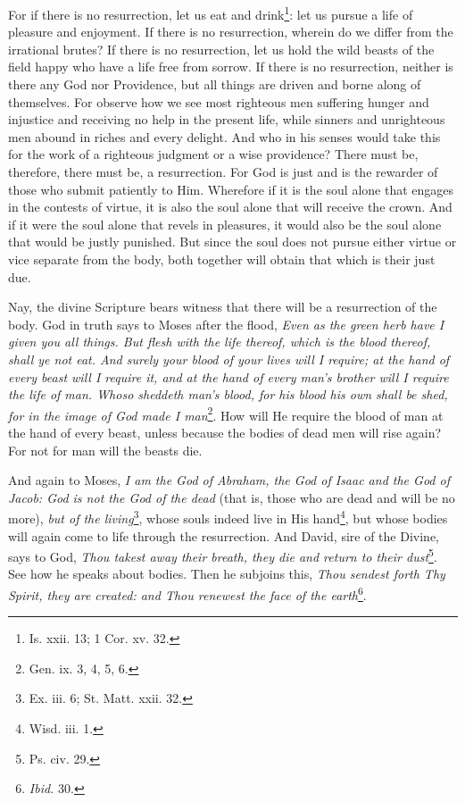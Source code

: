 For if there is no resurrection, let us eat and drink\footnote{Is. xxii. 13; 1 Cor. xv. 32.}: let us pursue a life of pleasure and enjoyment. If there is no resurrection, wherein do we differ from the irrational brutes? If there is no resurrection, let us hold the wild beasts of the field happy who have a life free from sorrow. If there is no resurrection, neither is there any God nor Providence, but all things are driven and borne along of themselves. For observe how we see most righteous men suffering hunger and injustice and receiving no help in the present life, while sinners and unrighteous men abound in riches and every delight. And who in his senses would take this for the work of a righteous judgment or a wise providence? There must be, therefore, there must be, a resurrection. For God is just and is the rewarder of those who submit patiently to Him. Wherefore if it is the soul alone that engages in the contests of virtue, it is also the soul alone that will receive the crown. And if it were the soul alone that revels in pleasures, it would also be the soul alone that would be justly punished. But since the soul does not pursue either virtue or vice separate from the body, both together will obtain that which is their just due.

Nay, the divine Scripture bears witness that there will be a resurrection of the body. God in truth says to Moses after the flood, \emph{Even as the green herb have I given you all things. But flesh with the life thereof, which is the blood thereof, shall ye not eat. And surely your blood of your lives will I require; at the hand of every beast will I require it, and at the hand of every man’s brother will I require the life of man. Whoso sheddeth man’s blood, for his blood his own shall be shed, for in the image of God made I man}\footnote{Gen. ix. 3, 4, 5, 6.}. How will He require the blood of man at the hand of every beast, unless because the bodies of dead men will rise again? For not for man will the beasts die.

And again to Moses, \emph{I am the God of Abra}\emph{ham, the God of Isaac and the God of Jacob: God is not the God of the dead} (that is, those who are dead and will be no more), \emph{but of the living}\footnote{Ex. iii. 6; St. Matt. xxii. 32.}, whose souls indeed live in His hand\footnote{Wisd. iii. 1.}, but whose bodies will again come to life through the resurrection. And David, sire of the Divine, says to God, \emph{Thou takest away their breath, they die and return to their dust}\footnote{Ps. civ. 29.}. See how he speaks about bodies. Then he subjoins this, \emph{Thou sendest forth Thy Spirit, they are created: and Thou renewest the face of the earth}\footnote{\emph{Ibid.} 30.}.

